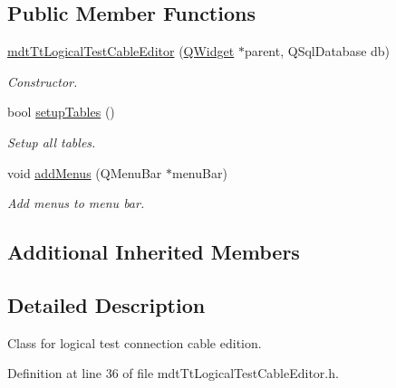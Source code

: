 \subsection*{Public Member Functions}
\begin{DoxyCompactItemize}
\item 
\hyperlink{classmdt_tt_logical_test_cable_editor_ac37787fc205e943c1295c22951cc4885}{mdt\-Tt\-Logical\-Test\-Cable\-Editor} (\hyperlink{class_q_widget}{Q\-Widget} $\ast$parent, Q\-Sql\-Database db)
\begin{DoxyCompactList}\small\item\em Constructor. \end{DoxyCompactList}\item 
bool \hyperlink{classmdt_tt_logical_test_cable_editor_a5b2d693df300953d3af67dad87cb5a0b}{setup\-Tables} ()
\begin{DoxyCompactList}\small\item\em Setup all tables. \end{DoxyCompactList}\item 
void \hyperlink{classmdt_tt_logical_test_cable_editor_a2cd7a8a56c8ce4f6aa1c7cd8c3add0c5}{add\-Menus} (Q\-Menu\-Bar $\ast$menu\-Bar)
\begin{DoxyCompactList}\small\item\em Add menus to menu bar. \end{DoxyCompactList}\end{DoxyCompactItemize}
\subsection*{Additional Inherited Members}


\subsection{Detailed Description}
Class for logical test connection cable edition. 

Definition at line 36 of file mdt\-Tt\-Logical\-Test\-Cable\-Editor.\-h.



